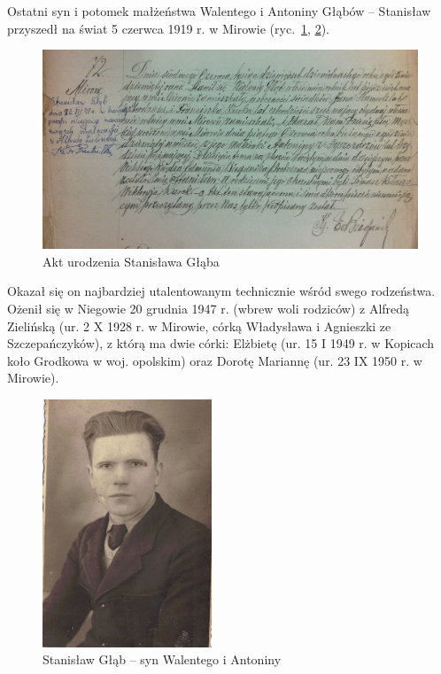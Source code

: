 Ostatni syn i potomek małżeństwa Walentego i Antoniny Głąbów -- Stanisław przyszedł na świat 5 czerwca 1919 r. w Mirowie (ryc.~\ref{rys:akt_urodzenia_stanislawa_glaba}, \ref{rys:stanislaw_glab}). 

\begin{figure}[!h]
\begin{center}
\includegraphics[width=\textwidth]{zdjecia/akt_urodzenia_stanislawa_glaba.jpg}
\caption{Akt urodzenia Stanisława Głąba}
\label{rys:akt_urodzenia_stanislawa_glaba}
\end{center}
\end{figure}


Okazał się on najbardziej utalentowanym technicznie wśród swego rodzeństwa. Ożenił się w Niegowie 20 grudnia 1947 r. (wbrew woli rodziców) z Alfredą Zielińską (ur. 2 X 1928 r. w Mirowie, córką Władysława i Agnieszki ze Szczepańczyków), z którą ma dwie córki: Elżbietę (ur. 15 I 1949 r. w Kopicach koło Grodkowa w woj. opolskim) oraz Dorotę Mariannę (ur. 23 IX 1950 r. w Mirowie). 


\begin{figure}[!ht]
\begin{center}
\includegraphics[width=0.45\textwidth]{zdjecia/stanislaw_glab.jpg}
\caption[Stanisław Głąb]{Stanisław Głąb -- syn Walentego i Antoniny}
\label{rys:stanislaw_glab}
\end{center}
\end{figure}


